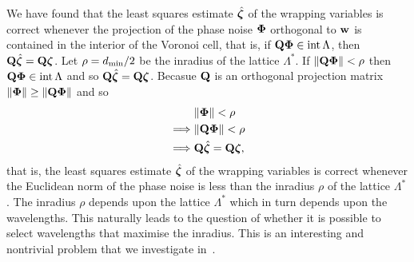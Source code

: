 We have found that the least squares estimate $\hat{\boldsymbol{\zeta}}$ of the wrapping variables is correct whenever the projection of the phase noise $\boldsymbol{\Phi}$ orthogonal to $\mathbf{w}$ is contained in the interior of the Voronoi cell, that is, if $\mathbf{Q} \boldsymbol{\Phi} \in \operatorname{int} \Lambda$, then $\mathbf{Q} \hat{\boldsymbol{\zeta}} = \mathbf{Q} \boldsymbol{\zeta}$.  Let $\rho = d_{\text{min}}/2$ be the inradius of the lattice $\Lambda^*$.  If $\|\mathbf{Q} \boldsymbol{\Phi}\| < \rho$ then $\mathbf{Q} \boldsymbol{\Phi} \in \operatorname{int} \Lambda$ and so $\mathbf{Q} \hat{\boldsymbol{\zeta}} = \mathbf{Q} \boldsymbol{\zeta}$.  Becasue $\mathbf{Q}$ is an orthogonal projection matrix $\|\boldsymbol{\Phi}\| \geq \|\mathbf{Q}\boldsymbol{\Phi}\|$ and so 
\begin{align*}
&\|\boldsymbol{\Phi}\| < \rho \\
\implies &\|\mathbf{Q}\boldsymbol{\Phi}\| < \rho \\
\implies &\mathbf{Q} \hat{\boldsymbol{\zeta}} = \mathbf{Q} \boldsymbol{\zeta},
\end{align*}
that is, the least squares estimate $\hat{\boldsymbol{\zeta}}$ of the wrapping variables is correct whenever the Euclidean norm of the phase noise is less than the inradius $\rho$ of the lattice $\Lambda^*$.  The inradius $\rho$ depends upon the lattice $\Lambda^*$ which in turn depends upon the wavelengths.  This naturally leads to the question of whether it is possible to select wavelengths that maximise the inradius.  This is an interesting and nontrivial problem that we investigate in~.



